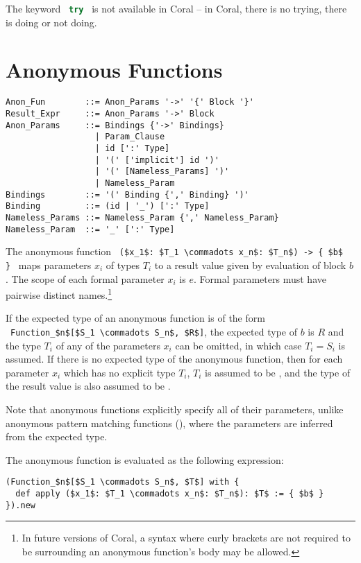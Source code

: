 The keyword ~\lstinline[language=Java]!try!~ is not available in Coral -- in Coral, there is no trying, there is doing or not doing.  





\section{Anonymous Functions}
\label{sec:anonymous-functions}

\syntax\begin{lstlisting}
Anon_Fun        ::= Anon_Params '->' '{' Block '}'
Result_Expr     ::= Anon_Params '->' Block 
Anon_Params     ::= Bindings {'->' Bindings}
                  | Param_Clause
                  | id [':' Type]
                  | '(' ['implicit'] id ')'
                  | '(' [Nameless_Params] ')'
                  | Nameless_Param
Bindings        ::= '(' Binding {',' Binding} ')'
Binding         ::= (id | '_') [':' Type]
Nameless_Params ::= Nameless_Param {',' Nameless_Param}
Nameless_Param  ::= '_' [':' Type]
\end{lstlisting}

The anonymous function ~\lstinline!($x_1$: $T_1 \commadots x_n$: $T_n$) -> { $b$ }!~ maps parameters $x_i$ of types $T_i$ to a result value given by evaluation of block $b$. The scope of each formal parameter $x_i$ is $e$. Formal parameters must have pairwise distinct names.\footnote{In future versions of Coral, a syntax where curly brackets are not required to be surrounding an anonymous function's body may be allowed.}

If the expected type of an anonymous function is of the form ~\lstinline!Function_$n$[$S_1 \commadots S_n$, $R$]!, the expected type of $b$ is $R$ and the type $T_i$ of any of the parameters $x_i$ can be omitted, in which case $T_i = S_i$ is assumed. If there is no expected type of the anonymous function, then for each parameter $x_i$ which has no explicit type $T_i$, $T_i$ is assumed to be , and the type of the result value is also assumed to be . 

Note that anonymous functions explicitly specify all of their parameters, unlike anonymous pattern matching functions (), where the parameters are inferred from the expected type. 

The anonymous function is evaluated as the following expression:
\begin{lstlisting}
(Function_$n$[$S_1 \commadots S_n$, $T$] with {
  def apply ($x_1$: $T_1 \commadots x_n$: $T_n$): $T$ := { $b$ }
}).new
\end{lstlisting}

